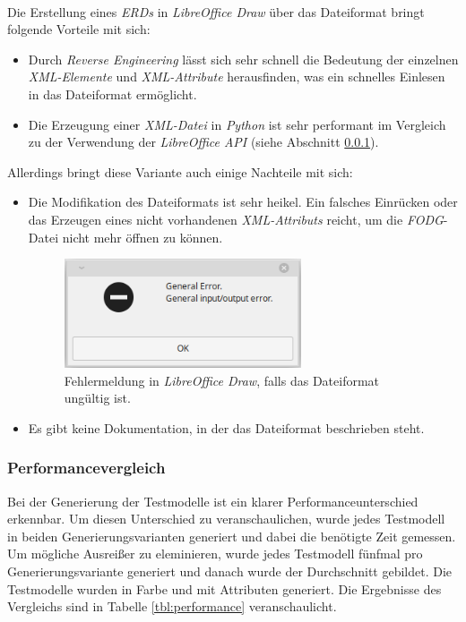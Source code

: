 \hon{}
\\
\noindent
Die Erstellung eines \textit{ERDs} in \textit{LibreOffice Draw} über das Dateiformat bringt folgende Vorteile mit sich:
\begin{itemize}
	\item Durch \textit{Reverse Engineering} lässt sich sehr schnell die Bedeutung der einzelnen \textit{XML-Elemente} und \textit{XML-Attribute} herausfinden, was ein schnelles Einlesen in das Dateiformat ermöglicht.
	\item Die Erzeugung einer \textit{XML-Datei} in \textit{Python} ist sehr performant im Vergleich zu der Verwendung der \textit{LibreOffice API} (siehe Abschnitt \ref{performance}).
\end{itemize}
\noindent
Allerdings bringt diese Variante auch einige Nachteile mit sich:
\begin{itemize}
	\item Die Modifikation des Dateiformats ist sehr heikel. Ein falsches Einrücken oder das Erzeugen eines nicht vorhandenen \textit{XML-Attributs} reicht, um die \textit{FODG}-Datei nicht mehr öffnen zu können.
	\begin{figure}[H]
		\centering
		\includegraphics[width=7cm]{images/21.png}
		\caption{Fehlermeldung in \textit{LibreOffice Draw}, falls das Dateiformat ungültig ist.}
		\label{ergebnis10}
	\end{figure}
	
	\item Es gibt keine Dokumentation, in der das Dateiformat beschrieben steht.
\end{itemize}


\subsubsection{Performancevergleich}
\label{performance}
\hon{}

Bei der Generierung der Testmodelle ist ein klarer Performanceunterschied erkennbar. Um diesen Unterschied zu veranschaulichen, wurde jedes Testmodell in beiden Generierungsvarianten generiert und dabei die benötigte Zeit gemessen. Um mögliche Ausreißer zu eleminieren, wurde jedes Testmodell fünfmal pro Generierungsvariante generiert und danach wurde der Durchschnitt gebildet. Die Testmodelle wurden in Farbe und mit Attributen generiert. Die Ergebnisse des Vergleichs sind in Tabelle \ref{tbl:performance} veranschaulicht.


